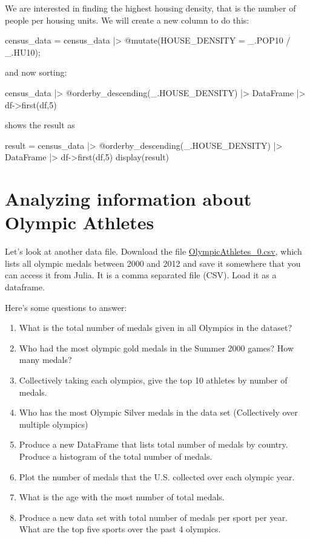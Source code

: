We are interested in finding the highest housing density, that is the
number of people per housing units. We will create a new column to do
this:

\begin{jlblock}[census]
census_data = census_data |> @mutate(HOUSE_DENSITY = _.POP10 / _.HU10);
\end{jlblock}
%
and now sorting:
%
\begin{jlblock}[census]
census_data |> @orderby_descending(_.HOUSE_DENSITY) |> DataFrame |> df->first(df,5)
\end{jlblock}
%
shows the result as
\begin{jlcode}[census]
result = census_data |> @orderby_descending(_.HOUSE_DENSITY) |> DataFrame |> df->first(df,5)
display(result)
\end{jlcode}
\printpythontex[verbatim][breakanywhere=true]

\section{Analyzing information about Olympic Athletes}

Let's look at another data file. Download the file \href{other/OlympicAthletes_0.csv}{OlympicAthletes\_0.csv}, which lists all olympic medals between 2000 and 2012 and save it somewhere that you can access it from Julia. It is a comma separated file (CSV). Load it as a dataframe.

Here's some questions to answer:
%
\begin{enumerate}
\item  What is the total number of medals given in all Olympics in the dataset?
\item  Who had the most olympic gold medals in the Summer 2000 games? How many medals?
\item  Collectively taking each olympics, give the top 10 athletes by number of medals.
\item  Who has the most Olympic Silver medals in the data set (Collectively over multiple olympics)
\item  Produce a new DataFrame that lists total number of medals by country.  Produce a histogram of the total number of medals.
\item  Plot the number of medals that the U.S. collected over each olympic year.
\item  What is the age with the most number of total medals.
\item  Produce a new data set with total number of medals per sport per year.   What are the top five sports over the past 4 olympics.
\end{enumerate}


